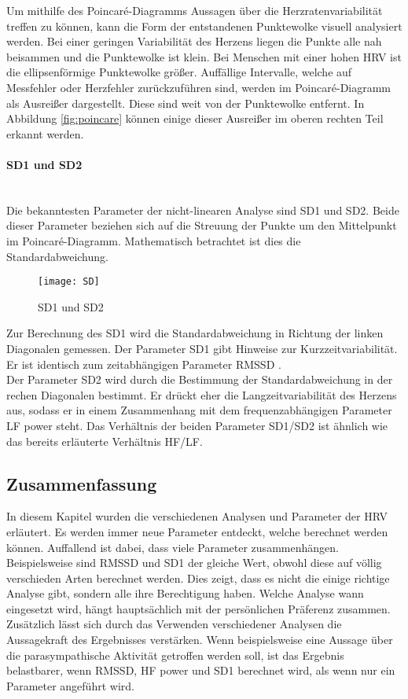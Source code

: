 Um mithilfe des Poincaré-Diagramms Aussagen über die Herzratenvariabilität treffen zu können, kann die Form der entstandenen Punktewolke visuell analysiert werden. Bei einer geringen Variabilität des Herzens liegen die Punkte alle nah beisammen und die Punktewolke ist klein. Bei Menschen mit einer hohen HRV ist die ellipsenförmige Punktewolke größer. Auffällige Intervalle, welche auf Messfehler oder Herzfehler zurückzuführen sind, werden im Poincaré-Diagramm als Ausreißer dargestellt. Diese sind weit von der Punktewolke entfernt. In Abbildung \ref{fig:poincare} können einige dieser Ausreißer im oberen rechten Teil erkannt werden.

 \paragraph{SD1 und SD2}\mbox{} \\
 Die bekanntesten Parameter der nicht-linearen Analyse sind SD1 und SD2. Beide dieser Parameter beziehen sich auf die Streuung der Punkte um den Mittelpunkt im Poincaré-Diagramm. Mathematisch betrachtet ist dies die Standardabweichung.\cite{poincare}
 \begin{figure}[H]
	\centering
	\texttt{[image: SD]}
	\caption{SD1 und SD2}
	\label{fig:SD}
	\cite{poincare}
\end{figure}

Zur Berechnung des SD1 wird die Standardabweichung in Richtung der linken Diagonalen gemessen. Der Parameter SD1 gibt Hinweise zur Kurzzeitvariabilität. Er ist identisch zum zeitabhängigen Parameter RMSSD \cite[S.6]{med}. \\

Der Parameter SD2 wird durch die Bestimmung der Standardabweichung in der rechen Diagonalen bestimmt. Er drückt eher die Langzeitvariabilität des Herzens aus, sodass er in einem Zusammenhang mit dem frequenzabhängigen Parameter LF power steht. Das Verhältnis der beiden Parameter SD1/SD2 ist ähnlich wie das bereits erläuterte Verhältnis HF/LF. \cite[S.7]{med} 

\subsection{Zusammenfassung}

In diesem Kapitel wurden die verschiedenen Analysen und Parameter der HRV erläutert. Es werden immer neue Parameter entdeckt, welche berechnet werden können. Auffallend ist dabei, dass viele Parameter zusammenhängen. Beispielsweise sind RMSSD und SD1 der gleiche Wert, obwohl diese auf völlig verschieden Arten berechnet werden. Dies zeigt, dass es nicht die einige richtige Analyse gibt, sondern alle ihre Berechtigung haben. Welche Analyse wann eingesetzt wird, hängt hauptsächlich mit der persönlichen Präferenz zusammen.\\
Zusätzlich lässt sich durch das Verwenden verschiedener Analysen die Aussagekraft des Ergebnisses verstärken. Wenn beispielsweise eine Aussage über die parasympathische Aktivität getroffen werden soll, ist das Ergebnis belastbarer, wenn RMSSD, HF power und SD1 berechnet wird, als wenn nur ein Parameter angeführt wird. \\


